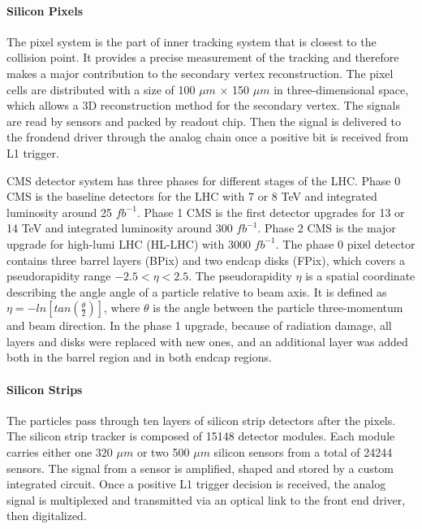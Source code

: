 \paragraph{Silicon Pixels}
The pixel system is the part of inner tracking system that is closest to the collision point. It provides a precise measurement of the tracking and therefore makes a major contribution to the secondary vertex reconstruction. The pixel cells are distributed with a size of 100 $\mu m$ $\times$ 150 $\mu m$ in three-dimensional space, which allows a 3D reconstruction method for the secondary vertex. The signals are read by sensors and packed by readout chip. Then the signal is delivered to the frondend driver through the analog chain once a positive bit is received from L1 trigger.

CMS detector system has three phases for different stages of the LHC. Phase 0 CMS is the baseline detectors for the LHC with 7 or 8 TeV and integrated luminosity around 25 $fb^{-1}$. Phase 1 CMS is the first detector upgrades for 13 or 14 TeV and integrated luminosity around 300 $fb^{-1}$. Phase 2 CMS is the major upgrade for high-lumi LHC (HL-LHC) with 3000 $fb^{-1}$. The phase 0 pixel detector contains three barrel layers (BPix) and two endcap disks (FPix), which covers a pseudorapidity range $-2.5<\eta<2.5$. The pseudorapidity $\eta$ is a spatial coordinate describing the angle angle of a particle relative to beam axis. It is defined as $\eta = -ln[tan(\frac{\theta}{2})]$, where $\theta$ is the angle between the particle three-momentum and beam direction. In the phase 1 upgrade\cite{Klein:2140071}, because of radiation damage, all layers and disks were replaced with new ones, and an additional layer was added both in the barrel region and in both endcap regions.


\paragraph{Silicon Strips}

The particles pass through ten layers of silicon strip detectors after the pixels. The silicon strip tracker is composed of 15148 detector modules. Each module carries either one 320 $\mu m$ or two 500 $\mu m$ silicon sensors from a total of 24244 sensors. The signal from a sensor is amplified, shaped and stored by a custom integrated circuit. Once a positive L1 trigger decision is received, the analog signal is multiplexed and transmitted via an optical link to the front end driver, then digitalized. 

